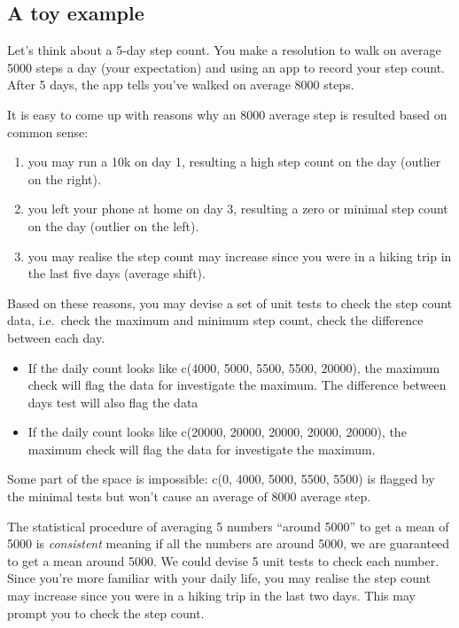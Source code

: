 \documentclass[
]{jds}
\providecommand{\tightlist}{%
  \setlength{\itemsep}{0pt}\setlength{\parskip}{0pt}}\usepackage{longtable,booktabs,array}
\begin{document}
\subsection{A toy example}\label{a-toy-example}

Let's think about a 5-day step count. You make a resolution to walk on
average 5000 steps a day (your expectation) and using an app to record
your step count. After 5 days, the app tells you've walked on average
8000 steps.

It is easy to come up with reasons why an 8000 average step is resulted
based on common sense:

\begin{enumerate}
\def\labelenumi{\arabic{enumi}.}
\tightlist
\item
  you may run a 10k on day 1, resulting a high step count on the day
  (outlier on the right).
\item
  you left your phone at home on day 3, resulting a zero or minimal step
  count on the day (outlier on the left).
\item
  you may realise the step count may increase since you were in a hiking
  trip in the last five days (average shift).
\end{enumerate}

Based on these reasons, you may devise a set of unit tests to check the
step count data, i.e.~check the maximum and minimum step count, check
the difference between each day.

\begin{itemize}
\tightlist
\item
  If the daily count looks like c(4000, 5000, 5500, 5500, 20000), the
  maximum check will flag the data for investigate the maximum. The
  difference between days test will also flag the data
\item
  If the daily count looks like c(20000, 20000, 20000, 20000, 20000),
  the maximum check will flag the data for investigate the maximum.
\end{itemize}

Some part of the space is impossible: c(0, 4000, 5000, 5500, 5500) is
flagged by the minimal tests but won't cause an average of 8000 average
step.

The statistical procedure of averaging 5 numbers ``around 5000'' to get
a mean of 5000 is \emph{consistent} meaning if all the numbers are
around 5000, we are guaranteed to get a mean around 5000. We could
devise 5 unit tests to check each number. Since you're more familiar
with your daily life, you may realise the step count may increase since
you were in a hiking trip in the last two days. This may prompt you to
check the step count.
\end{document}
